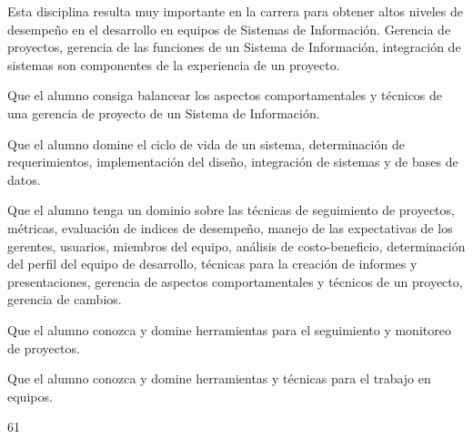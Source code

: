 \begin{syllabus}


\begin{justification}
Esta disciplina resulta muy importante en la carrera para obtener altos niveles de desempeño en el desarrollo en equipos de Sistemas de Información. Gerencia de proyectos, gerencia de las funciones de un Sistema de Información, integración de sistemas son componentes de la experiencia de un proyecto.
\end{justification}

\begin{goals}
\item Que el alumno consiga balancear los aspectos comportamentales y técnicos de una gerencia de proyecto de un Sistema de Información.
\item Que el alumno domine el ciclo de vida de un sistema, determinación de requerimientos, implementación del diseño, integración de sistemas y de bases de datos.
\item Que el alumno tenga un dominio sobre las técnicas de seguimiento de proyectos, métricas, evaluación de indices de desempeño, manejo de las expectativas de los gerentes, usuarios, miembros del equipo, análisis de costo-beneficio, determinación del perfil del equipo de desarrollo, técnicas para la creación de informes y presentaciones, gerencia de aspectos comportamentales y técnicos de un proyecto, gerencia de cambios.
\item Que el alumno conozca y domine herramientas para el seguimiento  y monitoreo de proyectos.
\item Que el alumno conozca y domine herramientas y técnicas para el trabajo en equipos.
\end{goals}

\begin{outcomes}
\end{outcomes}

\begin{unit}{\LUONEOHFIVEDef}{\LUONEOHFIVEBib}{6}{1}
   \begin{topics}
	\item \OMCONEOHTopicTWOxONEOHxONEOH
	\item \TDSSEVENTopicTHREExSEVENxTHREE
   \end{topics}
	\LUONEOHFIVEGoal
\end{unit}


\end{syllabus}
